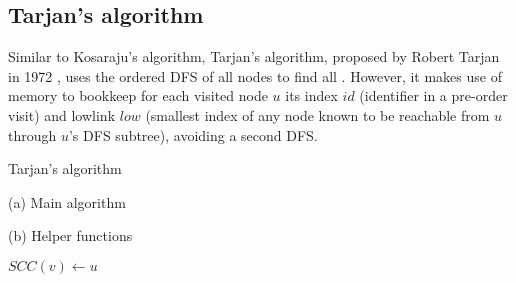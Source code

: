 \subsection{Tarjan's algorithm} \label{algorithm-scc-tarjan}
Similar to Kosaraju's algorithm, Tarjan's algorithm, proposed by Robert Tarjan in 1972 \cite{tarjan72}, uses the ordered \acrshort*{DFS} of all nodes to find all . However, it makes use of memory to bookkeep for each visited node $u$ its index $id$ (identifier in a pre-order visit) and lowlink $low$ (smallest index of any node known to be reachable from $u$ through $u$'s \acrshort*{DFS} subtree), avoiding a second \acrshort*{DFS}.
\begin{algorithm}[ht]
    \caption{Tarjan's algorithm}
    \label{alg-tarjan}
    \begin{minipage}[t]{0.40\linewidth}
        (a) Main algorithm
        \begin{algorithmic}[1]
                \EndFor
                    \EndIf
                \EndFor
                \State {}
            \EndFunction
        \end{algorithmic}
    \end{minipage}
    \begin{minipage}[t]{0.58\textwidth}
        (b) Helper functions
        \begin{algorithmic}[1]

                 \label{alg-line:tarjan-dfs-assign-low-init}
                    \label{alg-line:tarjan-dfs-cycle-begin}
                    \EndIf
                \EndFor
                \label{alg-line:tarjan-dfs-cycle-end}
                        {$SCC(v) \gets u$}
                    \EndWhile
                \EndIf
            \EndFunction
        \end{algorithmic}
    \end{minipage}
\end{algorithm}

